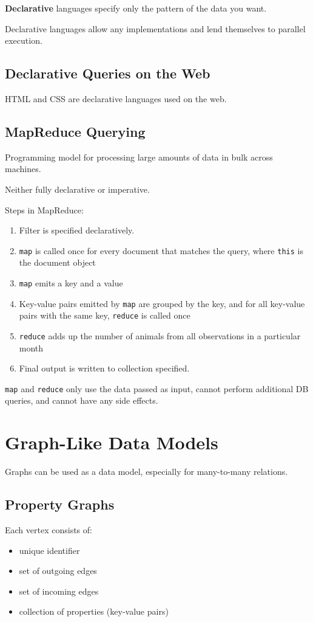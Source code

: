 \documentclass[11pt]{article}
\begin{document}
\textbf{Declarative} languages specify only the pattern of the data
you want.

Declarative languages allow any implementations and lend
themselves to parallel execution.
\subsection{Declarative Queries on the Web}
\label{sec:org3a1aa67}
HTML and CSS are declarative languages used on the web.
\subsection{MapReduce Querying}
\label{sec:org996f17e}
Programming model for processing large amounts of data in
bulk across machines.

Neither fully declarative or imperative.

Steps in MapReduce:
\begin{enumerate}
\item Filter is specified declaratively.
\item \texttt{map} is called once for every document that matches
the query, where \texttt{this} is the document object
\item \texttt{map} emits a key and a value
\item Key-value pairs emitted by \texttt{map} are grouped by the key,
and for all key-value pairs with the same key, \texttt{reduce}
is called once
\item \texttt{reduce} adds up the number of animals from all observations
in a particular month
\item Final output is written to collection specified.
\end{enumerate}

\texttt{map} and \texttt{reduce} only use the data passed as input, cannot
perform additional DB queries, and cannot have any side effects.
\section{Graph-Like Data Models}
\label{sec:org40e0e5a}
Graphs can be used as a data model, especially for many-to-many
relations.
\subsection{Property Graphs}
\label{sec:orga1a4e84}
Each vertex consists of:
\begin{itemize}
\item unique identifier
\item set of outgoing edges
\item set of incoming edges
\item collection of properties (key-value pairs)
\end{itemize}
\end{document}
